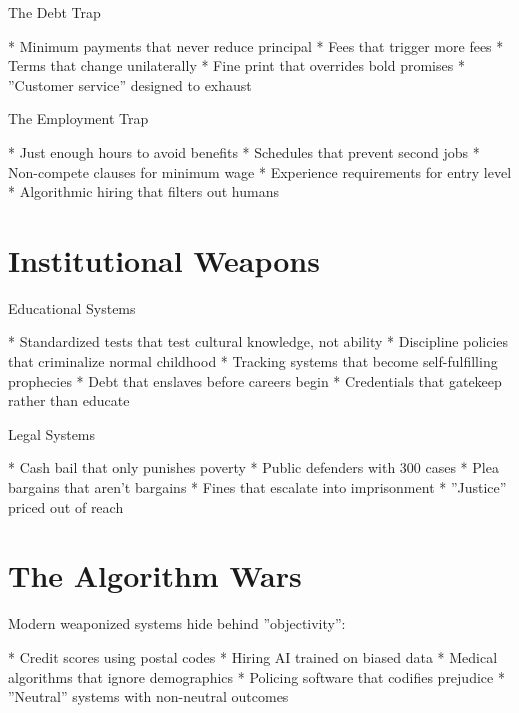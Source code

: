 \documentclass[12pt,oneside]{book}
\begin{document}
                The Debt Trap

                    * Minimum payments that never reduce principal
                    * Fees that trigger more fees
                    * Terms that change unilaterally
                    * Fine print that overrides bold promises
                    * ''Customer service'' designed to exhaust

                The Employment Trap

                    * Just enough hours to avoid benefits
                    * Schedules that prevent second jobs
                    * Non-compete clauses for minimum wage
                    * Experience requirements for entry level
                    * Algorithmic hiring that filters out humans

\section{Institutional Weapons}

                Educational Systems

                    * Standardized tests that test cultural knowledge, not ability
                    * Discipline policies that criminalize normal childhood
                    * Tracking systems that become self-fulfilling prophecies
                    * Debt that enslaves before careers begin
                    * Credentials that gatekeep rather than educate

                Legal Systems

                    * Cash bail that only punishes poverty
                    * Public defenders with 300 cases
                    * Plea bargains that aren't bargains
                    * Fines that escalate into imprisonment
                    * ''Justice'' priced out of reach

\section{The Algorithm Wars}

Modern weaponized systems hide behind ''objectivity'':

                    * Credit scores using postal codes
                    * Hiring AI trained on biased data
                    * Medical algorithms that ignore demographics
                    * Policing software that codifies prejudice
                    * ''Neutral'' systems with non-neutral outcomes
\end{document}
